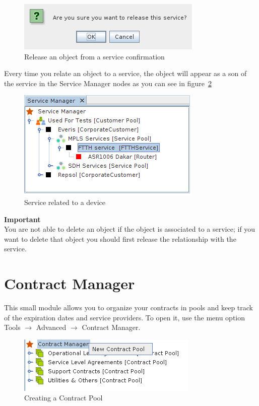 \documentclass[a4paper]{article}
\begin{document}
	\begin{figure}[h!]
		\centering
		\includegraphics[width=0.5\linewidth]{img/sm_release_from_service_confrimation.png}
		\caption{Release an object from a service confirmation}
		\label{fig:sm_release_from_service_confirmation}
	\end{figure}
	
	Every time you relate an object to a service, the object will appear as a son of the service in the Service Manager nodes as you can see in figure~\ref{fig:sm_device_relate_to_service}
	\begin{figure}[h!]
		\centering
		\includegraphics[width=0.5\linewidth]{img/sm_device_relate_to_service.png}
		\caption{Service related to a device}
		\label{fig:sm_device_relate_to_service}
	\end{figure}
	\begin{framed} {\large \textbf{Important}}\\
		You are not able to delete an object if the object is associated to a service; if you want to delete that object you should first release the relationship with the service.
	\end{framed}
	
	
	\clearpage
	\section{Contract Manager} \label{sec:contract_manager}
		This small module allows you to organize your contracts in pools and keep track of the expiration dates and service providers. To open it, use the menu option Tools $\rightarrow$ Advanced $\rightarrow$ Contract Manager.
		\begin{figure}[h!]
			\centering
			\includegraphics[width=0.5\linewidth]{img/contract_manager_new_contract_pool.png}
			\caption{Creating a Contract Pool}
			\label{fig:contract_manager_new_contract_pool}
		\end{figure}
		
\end{document}
